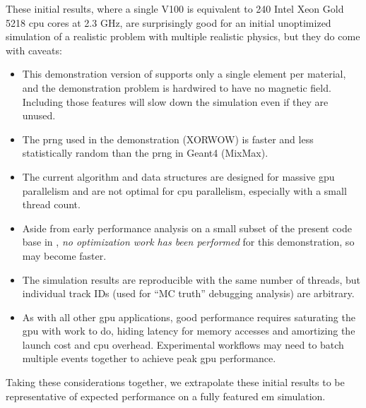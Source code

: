 These initial results, where a single \nvidia V100 is equivalent to 240 Intel
Xeon Gold 5218 \ac{cpu} cores at 2.3 GHz, are surprisingly good for an initial
unoptimized simulation of a realistic problem with multiple realistic physics,
but they do come with caveats:
\begin{itemize}[itemsep=0pt]
  \item This demonstration version of \celeritas supports only a single element
    per material, and the demonstration problem is hardwired to have no magnetic
    field. Including those features will slow down the simulation even if they
    are unused.
  \item The \ac{prng} used in the \celeritas demonstration ({XORWOW}) is faster
    and less statistically random than the \ac{prng} in Geant4 ({MixMax}).
  \item The current \celeritas algorithm and data structures are designed for
    massive \ac{gpu} parallelism and are not optimal for \ac{cpu} parallelism,
    especially with a small thread count.
  \item Aside from early performance analysis on a small subset of the present
    code base in \cite{johnson_2021}, \emph{no optimization work has been
    performed} for this demonstration, so \celeritas may become faster.
  \item The simulation results are reproducible with the same number of threads,
    but individual track IDs (used for ``MC truth'' debugging analysis) are
    arbitrary.
  \item As with all other \ac{gpu} applications, good performance requires
    saturating the \ac{gpu} with work to do, hiding latency for memory accesses
    and amortizing the launch cost and \ac{cpu} overhead. Experimental workflows
    may need to batch multiple events together to achieve peak \ac{gpu}
    performance.
\end{itemize}
Taking these considerations together, we extrapolate these initial results to be
representative of expected performance on a fully featured \celeritas \ac{em}
simulation.

